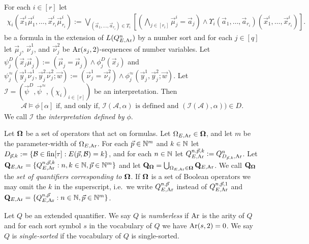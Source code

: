 \documentclass[../main/thesis.tex]{subfiles}
\begin{document}
\begin{textbox}[14.0cm]
  For each $i \in [r]$ let
  \begin{align*} \chi_i (\vec{x}^i_1 \vec{\mu}^i_1, \ldots, \vec{x}^i_{r_i}
    \vec{\mu}^i_{r_i}) := \bigvee_{(\vec{a}_1, \ldots, \vec{a}_{r_i}) \in
      T_i}[(\bigwedge_{j \in [r_i]} \vec{\mu}^i_j= \vec{a}_j) \land
    \Upsilon_i(\vec{a}_1, \ldots, \vec{a}_{r_i})(\vec{x}^i_1, \ldots,
    \vec{x}^i_{r_i})].
  \end{align*}
  be a formula in the extension of $L(Q^{n}_{E, \text{\upshape Ar}})$ by a number sort and for
  each $j \in [q]$ let $\vec{\mu}_j$, $\vec{\nu}^1_j$, and $\vec{\nu}^2_j$ be
  $\text{\upshape Ar}(s_j, 2)$-sequences of number variables. Let $\psi^D_j(\vec{x}_j
  \vec{\mu}_j) := (\vec{\mu}_j = \vec{\mu}_j) \land \phi^D_j (\vec{x}_j)$ and
  $\psi^\approx_j(\vec{y}^1_j \vec{\nu}^1_j, \vec{y}^2_j \vec{\nu}^2_j; \vec{w})
  := (\vec{\nu}^1_j = \vec{\nu}^2_j)\land \phi^\approx_j (\vec{y}^1_j ,
  \vec{y}^2_j ; \vec{w})$. Let $\mathcal{I} = (\vec{\psi}^D, \vec{\psi}^\approx,
  (\chi_i)_{i \in [r]})$ be an interpretation. Then
  \begin{align*}
    \mathcal{A} \models \phi [\alpha] \text{ if, and only if, } \mathcal{I}(\mathcal{A},
    \alpha) \text{ is defined and } (\mathcal{I}(\mathcal{A}), \alpha)) \in D.
  \end{align*}
  We call $\mathcal{I}$ the \emph{interpretation defined by $\phi$}.
\end{textbox}
Let $\mathbf{\mathbf{\Omega}}$ be a set of operators that act on formulas. Let $\Omega_{E, \text{\upshape Ar}}
\in \mathbf{\mathbf{\Omega}}$, and let $m$ be the parameter-width of $\Omega_{E, \text{\upshape Ar}}$. For each
$\vec{p} \in \mathbb{N}^m$ and $k \in \mathbb{N}$ let $D_{\vec{p}, k} := \{ \mathcal{B}
\in \text{\upshape fin}{[\tau]} : E(\vec{p}, \mathcal{B}) = k\}$, and for each $n \in \mathbb{N}$ let
$Q^{n, \vec{p}, k}_{E, \text{\upshape Ar}} := Q^n_{D_{\vec{p}, k}, \text{\upshape Ar}}$. Let $\mathbf{Q}_{E,
  \text{\upshape Ar}} = \{Q^{n, \vec{p}, k}_{E, \text{\upshape Ar}} : n, k \in \mathbb{N}, \vec{p} \in \mathbb{N}^m\}$
and let $\mathbf{Q}_{\mathbf{\mathbf{\Omega}}} = \bigcup_{\Omega_{E, \text{\upshape Ar}} \in \mathbf{\mathbf{\Omega}}} \mathbf{Q}_{E,
  \text{\upshape Ar}}$. We call $\mathbf{Q}_{\mathbf{\mathbf{\Omega}}}$ the \emph{set of quantifiers corresponding
  to $\mathbf{\mathbf{\Omega}}$}. If $\mathbf{\mathbf{\Omega}}$ is a set of Boolean operators we may omit the $k$ in
the superscript, i.e.\ we write $Q^{n, \vec{p}}_{E, \text{\upshape Ar}}$ instead of $Q^{n,
  \vec{p}, 1}_{E, \text{\upshape Ar}}$ and $\mathbf{Q}_{E, \text{\upshape Ar}} = \{Q^{n, \vec{p}}_{E, \text{\upshape Ar}} : n
\in \mathbb{N}, \vec{p} \in \mathbb{N}^m\}$.

\begin{definition}
  Let $Q$ be an extended quantifier. We say $Q$ is \emph{numberless} if $\text{\upshape Ar}$ is
  the arity of $Q$ and for each sort symbol $s$ in the vocabulary of $Q$ we have
  $\text{\upshape Ar}(s, 2) = 0$. We say $Q$ is \emph{single-sorted} if the vocabulary of $Q$
  is single-sorted.
\end{definition}
\end{document}
